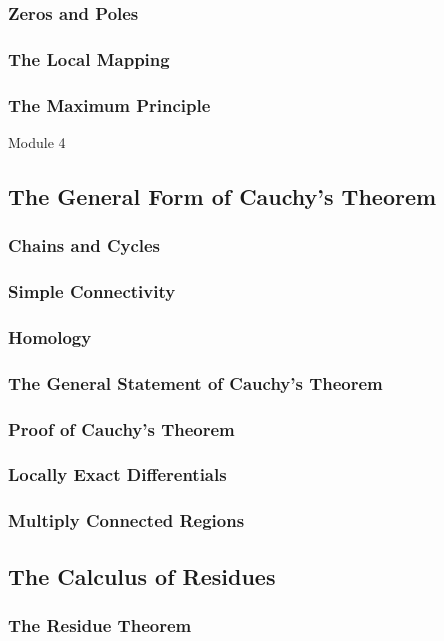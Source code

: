 \subsubsection{Zeros and Poles}
\subsubsection{The Local Mapping}
\subsubsection{The Maximum Principle}
{\Large Module 4 }
\subsection{The General Form of Cauchy's Theorem}
\subsubsection{Chains and Cycles}
\subsubsection{Simple Connectivity}
\subsubsection{Homology}
\subsubsection{The General Statement of Cauchy's Theorem}
\subsubsection{Proof of Cauchy's Theorem}
\subsubsection{Locally Exact Differentials}
\subsubsection{Multiply Connected Regions}
\subsection{The Calculus of Residues}
\subsubsection{The Residue Theorem}
